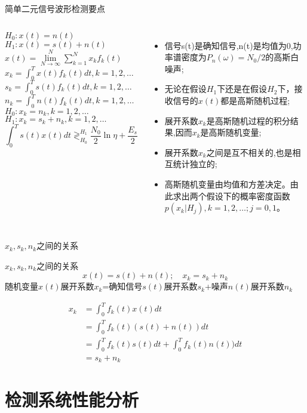 \begin{frame}{简单二元信号波形检测要点}
\begin{columns}
	$H_0: x(t)=n(t)$\\
	$H_1: x(t)=s(t)+n(t)$\\
	$x(t)=\lim\limits_{N\to\infty}^N\sum\limits_{k=1}^Nx_kf_k(t)$\\
	$x_k=\int_{0}^{T}x(t)f_k(t)dt, k=1,2,\dots$\\
	$s_k=\int_{0}^{T}s(t)f_k(t)dt, k=1,2,\dots$\\
	$n_k=\int_{0}^{T}n(t)f_k(t)dt, k=1,2,\dots$\\
	$H_0: x_k=n_k,k=1,2,\dots$\\
	$H_1: x_k=s_k+n_k,k=1,2,\dots$
	\[ \int_{0}^{T}s(t)x(t)dt\mathop{\gtrless}_{H_0}^{H_1}\frac{N_0}{2}\ln\eta+\frac{E_s}{2} \]
	\begin{itemize}
		\item 信号s(t)是确知信号,n(t)是均值为0,功率谱密度为$P_n(\omega)=N_0/2$的高斯白噪声;
		\item 无论在假设$H_1$下还是在假设$H_2$下，接收信号的$x(t)$都是高斯随机过程;
		\item 展开系数$x_k$是高斯随机过程的积分结果,因而$x_k$是高斯随机变量;
		\item 展开系数$x_k$之间是互不相关的,也是相互统计独立的;
		\item 高斯随机变量由均值和方差决定。由此求出两个假设下的概率密度函数$p(x_k|H_j),k=1,2,\dots;j=0,1$。
	\end{itemize}
\end{columns}
\end{frame}

\begin{frame}{$x_k,s_k,n_k$之间的关系}
\begin{block}{$x_k,s_k,n_k$之间的关系}
	\[x(t)=s(t)+n(t); \quad x_k=s_k+n_k \]
	随机变量$x(t)$展开系数$x_k$=确知信号$s(t)$展开系数$s_k$+噪声$n(t)$展开系数$n_k$
\end{block}
\begin{align*}
x_k&=\int_{0}^{T}f_k(t)x(t)dt\\
&=\int_{0}^{T}f_k(t)(s(t)+n(t))dt\\
&=\int_{0}^{T}f_k(t)s(t)dt+\int_{0}^{T}f_k(t)n(t))dt\\
&=s_k+n_k
\end{align*}
\end{frame}

\section{检测系统性能分析}

